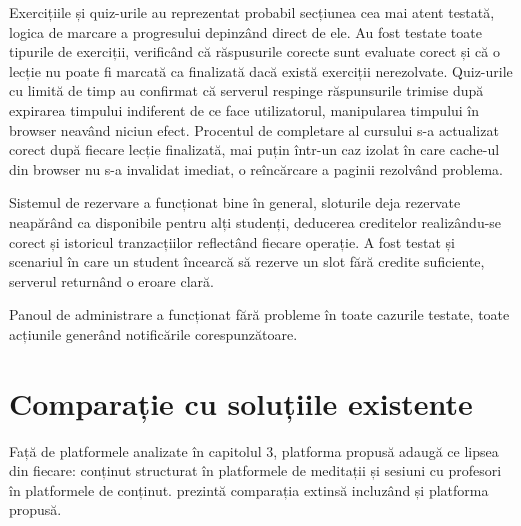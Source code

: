 Exercițiile și quiz-urile au reprezentat probabil secțiunea cea mai atent testată, logica de marcare a progresului depinzând direct de ele. Au fost testate toate tipurile de exerciții, verificând că răspusurile corecte sunt evaluate corect și că o lecție nu poate fi marcată ca finalizată dacă există exerciții nerezolvate. Quiz-urile cu limită de timp au confirmat că serverul respinge răspunsurile trimise după expirarea timpului indiferent de ce face utilizatorul, manipularea timpului în browser neavând niciun efect. Procentul de completare al cursului s-a actualizat corect după fiecare lecție finalizată, mai puțin într-un caz izolat în care cache-ul din browser nu s-a invalidat imediat, o reîncărcare a paginii rezolvând problema.

Sistemul de rezervare a funcționat bine în general, sloturile deja rezervate neapărând ca disponibile pentru alți studenți, deducerea creditelor realizându-se corect și istoricul tranzacțiilor reflectând fiecare operație. A fost testat și scenariul în care un student încearcă să rezerve un slot fără credite suficiente, serverul returnând o eroare clară.

Panoul de administrare a funcționat fără probleme în toate cazurile testate, toate acțiunile generând notificările corespunzătoare.

\section{Comparație cu soluțiile existente}
Față de platformele analizate în capitolul 3, platforma propusă adaugă ce lipsea din fiecare: conținut structurat în platformele de meditații și sesiuni cu profesori în platformele de conținut.  prezintă comparația extinsă incluzând și platforma propusă.

\begin{table}[htbp]
    \centering
    \caption{Compararea platformei propuse cu soluțiile existente}
    \label{tab:extended-platform-comparison}
\end{table}

